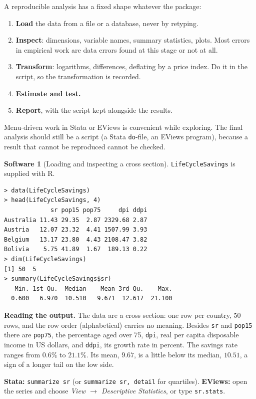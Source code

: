 \documentclass[11pt,a4paper]{article}
\numberwithin{equation}{section}
\theoremstyle{definition}
\newtheorem{software}[thm]{Software}
\begin{document}
A reproducible analysis has a fixed shape whatever the package:
\begin{enumerate}[label=(\arabic*)]
\item \textbf{Load} the data from a file or a database, never by retyping.
\item \textbf{Inspect}: dimensions, variable names, summary statistics, plots. Most errors in empirical work are data errors found at
this stage or not at all.
\item \textbf{Transform}: logarithms, differences, deflating by a price index. Do it in the script, so the transformation is recorded.
\item \textbf{Estimate and test.}
\item \textbf{Report}, with the script kept alongside the results.
\end{enumerate}
Menu-driven work in Stata or EViews is convenient while exploring. The final analysis should still be a script (a Stata \texttt{do}-file, an
EViews program), because a result that cannot be reproduced cannot be checked.

\begin{software}[Loading and inspecting a cross section]
\label{sw:lcs}
\texttt{LifeCycleSavings} is supplied with R.
{\small\begin{verbatim}
> data(LifeCycleSavings)
> head(LifeCycleSavings, 4)
             sr pop15 pop75     dpi ddpi
Australia 11.43 29.35  2.87 2329.68 2.87
Austria   12.07 23.32  4.41 1507.99 3.93
Belgium   13.17 23.80  4.43 2108.47 3.82
Bolivia    5.75 41.89  1.67  189.13 0.22
> dim(LifeCycleSavings)
[1] 50  5
> summary(LifeCycleSavings$sr)
   Min. 1st Qu.  Median    Mean 3rd Qu.    Max.
  0.600   6.970  10.510   9.671  12.617  21.100
\end{verbatim}}
\textbf{Reading the output.} The data are a cross section: one row per country, 50 rows, and the row order (alphabetical) carries no meaning.
Besides \texttt{sr} and \texttt{pop15} there are \texttt{pop75}, the percentage aged over 75, \texttt{dpi}, real per capita disposable income in
US dollars, and \texttt{ddpi}, its growth rate in percent. The savings rate ranges from $0.6\%$ to $21.1\%$. Its mean, $9.67$, is a little below
its median, $10.51$, a sign of a longer tail on the low side.

\textbf{Stata:} \texttt{summarize sr} (or \texttt{summarize sr, detail} for quartiles). \textbf{EViews:} open the series and choose
\emph{View $\to$ Descriptive Statistics}, or type \texttt{sr.stats}.
\end{software}
\end{document}
